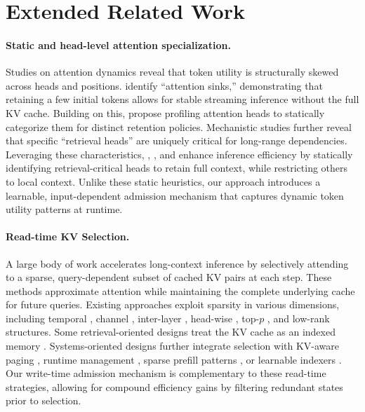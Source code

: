 \section{Extended Related Work}
\label{app:related}

\paragraph{Static and head-level attention specialization.} Studies on attention dynamics reveal that token utility is structurally skewed across heads and positions. \citet{streamingllm} identify ``attention sinks,'' demonstrating that retaining a few initial tokens allows for stable streaming inference without the full KV cache. Building on this, \citet{fastgen} propose profiling attention heads to statically categorize them for distinct retention policies. Mechanistic studies \cite{retrievalhead} further reveal that specific ``retrieval heads'' are uniquely critical for long-range dependencies. Leveraging these characteristics, \citet{razorattn}, \citet{duoattn}, and \citet{prulong} enhance inference efficiency by statically identifying retrieval-critical heads to retain full context, while restricting others to local context. Unlike these static heuristics, our approach introduces a learnable, input-dependent admission mechanism that captures dynamic token utility patterns at runtime.

\paragraph{Read-time KV Selection.} A large body of work accelerates long-context inference by selectively attending to a sparse, query-dependent subset of cached KV pairs at each step. These methods approximate attention while maintaining the complete underlying cache for future queries. Existing approaches exploit sparsity in various dimensions, including temporal \cite{hip,specache,attnpredictor}, channel \cite{sparq}, inter-layer \cite{omnikv,hshare}, head-wise \cite{moh,qada}, top-$p$ \cite{twilight}, and low-rank \cite{sea,loki} structures. Some retrieval-oriented designs treat the KV cache as an indexed memory \cite{arkvale,retrievalattn,squeezedattn,pqcache,clusterkv,magicpig,retroinfer}. Systems-oriented designs further integrate selection with KV-aware paging \cite{quest,lserve}, runtime management \cite{infinigen,shadowkv}, sparse prefill patterns \cite{minference,flexprefill,spargeattn,xattn}, or learnable indexers \cite{seerattn,moba,nsa,seerattnr,deepseekv32,deepseekv4}. Our write-time admission mechanism is complementary to these read-time strategies, allowing for compound efficiency gains by filtering redundant states prior to selection.


